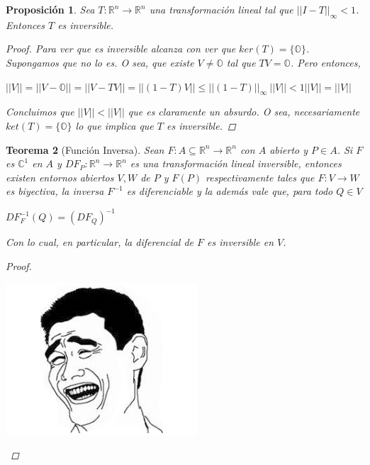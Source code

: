 \documentclass[]{article}
\newtheorem{teo}{Teorema}
\newtheorem{prop}[teo]{Proposición}
\def\R{\mathbb{R}}
\begin{document}
\begin{prop}
	Sea $T:\R^n\to\R^n$ una transformación lineal tal que $||I-T||_{\infty} < 1$. Entonces $T$ es inversible.
	\begin{proof}
		Para ver que es inversible alcanza con ver que $ker(T) = \{\mathds{O}\}$. Supongamos que no lo es. O sea, que existe $V\neq \mathds{O}$ tal que $TV = \mathds{O}$. Pero entonces, 
		\begin{center}
			$||V|| = ||V - \mathds{O}|| = ||V-TV|| = ||(1-T)V|| \leq ||(1-T)||_{\infty}\ ||V|| < 1||V|| = ||V||$ 
		\end{center}
		Concluimos que $||V||<||V||$ que es claramente un absurdo. O sea, necesariamente $ket(T) = \{\mathds{O}\}$ lo que implica que $T$ es inversible.
	\end{proof}
\end{prop}

\begin{teo}[Función Inversa]
	Sean $F:A\subseteq \R^n\to\R^n$ con $A$ abierto y $P\in A$. Si $F$ es $\mathds{C}^1$ en $A$ y $DF_P:\R^n\to\R^n$ es una transformación lineal inversible, entonces existen entornos abiertos $V,W$ de $P$ y $F(P)$ respectivamente tales que $F:V\to W$ es biyectiva, la inversa $F^{-1}$ es diferenciable y la además vale que, para todo $Q\in V$
	\begin{center}
		$DF^{-1}_F(Q) = (DF_Q)^{-1}$
	\end{center}
	Con lo cual, en particular, la diferencial de $F$ es inversible en $V$.
	\begin{proof}
		~\newline
		\begin{center}
			\includegraphics[scale=0.50]{YMM.jpg}
		\end{center}
	\end{proof}
\end{teo}
\end{document}
